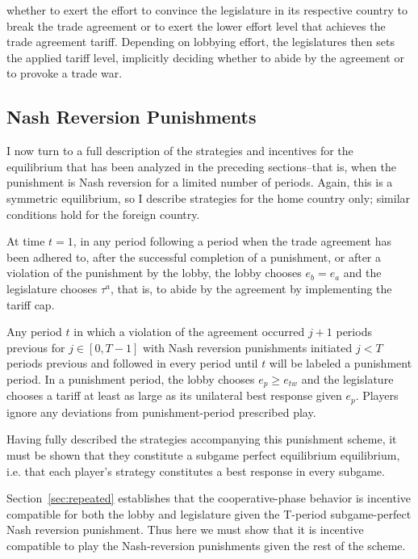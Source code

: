\documentclass[authoryear, review]{elsarticle}
\begin{document}
whether to exert the effort to convince the legislature in its respective country to break the trade agreement or to exert the lower effort level that achieves the trade agreement tariff. Depending on lobbying effort, the legislatures then sets the applied tariff level, implicitly deciding whether to abide by the agreement or to provoke a trade war. %



\subsection{Nash Reversion Punishments}
\label{sec:nashrev}
I now turn to a full description of the strategies and incentives for the equilibrium that has been analyzed in the preceding sections--that is, when the punishment is Nash reversion for a limited number of periods. Again, this is a symmetric equilibrium, so I describe strategies for the home country only; similar conditions hold for the foreign country.

At time $t=1$, in any period following a period when the trade agreement has been adhered to, after the successful completion of a punishment, or after a violation of the punishment by the lobby, the lobby chooses $e_b =e_a$ and the legislature chooses $\tau^a$, that is, to abide by the agreement by implementing the tariff cap.

Any period $t$ in which a violation of the agreement occurred $j+1$ periods previous for $j \in [0,T-1]$ with Nash reversion punishments initiated $j<T$ periods previous and followed in every period until $t$ will be labeled a punishment period. In a punishment period, the lobby chooses $e_p \geq e_{tw}$ and the legislature chooses a tariff at least as large as its unilateral best response given $e_p$. Players ignore any deviations from punishment-period prescribed play.

Having fully described the strategies accompanying this punishment scheme, it must be shown that they constitute a subgame perfect equilibrium equilibrium, i.e. that each player's strategy constitutes a best response in every subgame.
		
Section~\ref{sec:repeated} establishes that the cooperative-phase behavior is incentive compatible for both the lobby and legislature given the T-period subgame-perfect Nash reversion punishment. Thus here we must show that it is incentive compatible to play the Nash-reversion punishments given the rest of the scheme.
\end{document}
